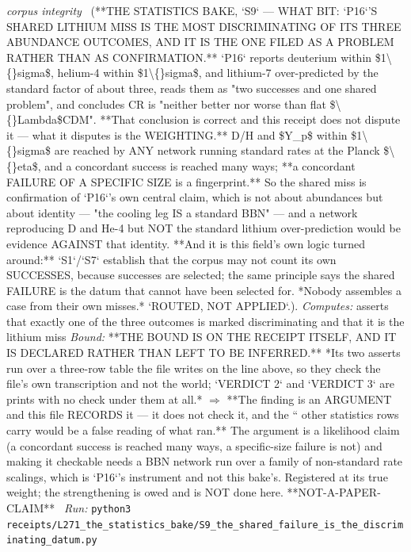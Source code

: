 \begin{description}
\textit{corpus integrity} \ (**THE STATISTICS BAKE, `S9` --- WHAT BIT: `P16`'S SHARED LITHIUM MISS IS THE MOST DISCRIMINATING OF ITS THREE ABUNDANCE OUTCOMES, AND IT IS THE ONE FILED AS A PROBLEM RATHER THAN AS CONFIRMATION.** `P16` reports deuterium within \$1\textbackslash\{\}sigma\$, helium-4 within \$1\textbackslash\{\}sigma\$, and lithium-7 over-predicted by the standard factor of about three, reads them as "two successes and one shared problem", and concludes CR is "neither better nor worse than flat \$\textbackslash\{\}Lambda\$CDM". **That conclusion is correct and this receipt does not dispute it --- what it disputes is the WEIGHTING.** D/H and \$Y\_p\$ within \$1\textbackslash\{\}sigma\$ are reached by ANY network running standard rates at the Planck \$\textbackslash\{\}eta\$, and a concordant success is reached many ways; **a concordant FAILURE OF A SPECIFIC SIZE is a fingerprint.** So the shared miss is confirmation of `P16`'s own central claim, which is not about abundances but about identity --- "the cooling leg IS a standard BBN" --- and a network reproducing D and He-4 but NOT the standard lithium over-prediction would be evidence AGAINST that identity. **And it is this field's own logic turned around:** `S1`/`S7` establish that the corpus may not count its own SUCCESSES, because successes are selected; the same principle says the shared FAILURE is the datum that cannot have been selected for. *Nobody assembles a case from their own misses.*  `ROUTED, NOT APPLIED`.). 
\emph{Computes:} asserts that exactly one of the three outcomes is marked discriminating and that it is the lithium miss
 \emph{Bound:}  **THE BOUND IS ON THE RECEIPT ITSELF, AND IT IS DECLARED RATHER THAN LEFT TO BE INFERRED.** *Its two asserts run over a three-row table the file writes on the line above, so they check the file's own transcription and not the world; `VERDICT 2` and `VERDICT 3` are prints with no check under them at all.* \ensuremath{\Rightarrow} **The finding is an ARGUMENT and this file RECORDS it --- it does not check it, and the `` other statistics rows carry would be a false reading of what ran.** The argument is a likelihood claim (a concordant success is reached many ways, a specific-size failure is not) and making it checkable needs a BBN network run over a family of non-standard rate scalings, which is `P16`'s instrument and not this bake's. Registered at its true weight; the strengthening is owed and is NOT done here. **NOT-A-PAPER-CLAIM**
\ \emph{Run:} \texttt{python3 receipts/L271\_the\_statistics\_bake/S9\_the\_shared\_failure\_is\_the\_discriminating\_datum.py}

\end{description}
